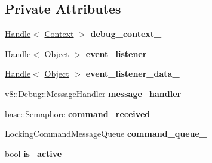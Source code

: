 \subsection*{Private Attributes}
\begin{DoxyCompactItemize}
\item 
\hyperlink{classv8_1_1internal_1_1_handle}{Handle}$<$ \hyperlink{classv8_1_1internal_1_1_context}{Context} $>$ {\bfseries debug\+\_\+context\+\_\+}\hypertarget{classv8_1_1internal_1_1_debug_ad3967155afe5a7d5e8414b81c2b1b560}{}\label{classv8_1_1internal_1_1_debug_ad3967155afe5a7d5e8414b81c2b1b560}

\item 
\hyperlink{classv8_1_1internal_1_1_handle}{Handle}$<$ \hyperlink{classv8_1_1internal_1_1_object}{Object} $>$ {\bfseries event\+\_\+listener\+\_\+}\hypertarget{classv8_1_1internal_1_1_debug_a4eea3e78b2492228a303a82fa294a11f}{}\label{classv8_1_1internal_1_1_debug_a4eea3e78b2492228a303a82fa294a11f}

\item 
\hyperlink{classv8_1_1internal_1_1_handle}{Handle}$<$ \hyperlink{classv8_1_1internal_1_1_object}{Object} $>$ {\bfseries event\+\_\+listener\+\_\+data\+\_\+}\hypertarget{classv8_1_1internal_1_1_debug_a2acbcb50c20461aeb2704b16a9db5491}{}\label{classv8_1_1internal_1_1_debug_a2acbcb50c20461aeb2704b16a9db5491}

\item 
\hyperlink{classv8_1_1_debug_a526826b857bd3e3efa184e12bcebc694}{v8\+::\+Debug\+::\+Message\+Handler} {\bfseries message\+\_\+handler\+\_\+}\hypertarget{classv8_1_1internal_1_1_debug_a7d6f95ee1f6cb77063c876eea1b24a8b}{}\label{classv8_1_1internal_1_1_debug_a7d6f95ee1f6cb77063c876eea1b24a8b}

\item 
\hyperlink{classv8_1_1base_1_1_semaphore}{base\+::\+Semaphore} {\bfseries command\+\_\+received\+\_\+}\hypertarget{classv8_1_1internal_1_1_debug_ae9fffa1d919c14276b7ea4eb7df84d7e}{}\label{classv8_1_1internal_1_1_debug_ae9fffa1d919c14276b7ea4eb7df84d7e}

\item 
Locking\+Command\+Message\+Queue {\bfseries command\+\_\+queue\+\_\+}\hypertarget{classv8_1_1internal_1_1_debug_a90905933d6aa2c1d1eb81a0de543d158}{}\label{classv8_1_1internal_1_1_debug_a90905933d6aa2c1d1eb81a0de543d158}

\item 
bool {\bfseries is\+\_\+active\+\_\+}\hypertarget{classv8_1_1internal_1_1_debug_ab774959255f8f0c991b2493a9158e383}{}\label{classv8_1_1internal_1_1_debug_ab774959255f8f0c991b2493a9158e383}


\end{DoxyCompactItemize}
